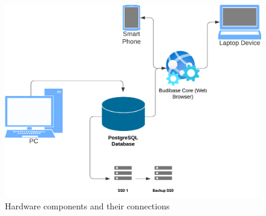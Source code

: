 \documentclass{article}
\begin{document}
\begin{figure}[h]
    \centering 
    \includegraphics[width=1\linewidth]{pictures/hardware_diagram.png} 
    \caption{Hardware components and their connections} 
    \label{fig:hardware} 
\end{figure} 
\FloatBarrier
\end{document}
